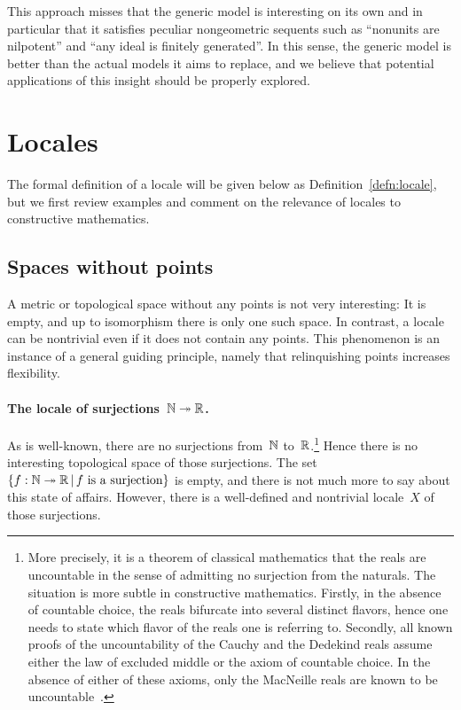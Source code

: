 \documentclass{ws-rv9x6}
\begin{document}
{{This approach misses that the generic model is interesting on its own and in
particular that it satisfies peculiar nongeometric sequents such as ``nonunits
are nilpotent'' and ``any ideal is \notnot finitely generated''. In this sense,
the generic model is better than the actual models it aims to replace, and we
believe that potential applications of this insight should be properly
explored.}


\section{Locales}
\label{sect:locales}

The formal definition of a locale will be given below as
Definition~\ref{defn:locale}, but we first review examples and comment on
the relevance of locales to constructive mathematics.

\subsection{Spaces without points}
\label{sect:examples-no-points}

A metric or topological space without any points is not very interesting: It is
empty, and up to isomorphism there is only one such space. In contrast, a
locale can be nontrivial even if it does not contain any points. This
phenomenon is an instance of a general guiding principle, namely that relinquishing
points increases flexibility.

\paragraph{The locale of surjections~$\mathbb{N} \twoheadrightarrow \mathbb{R}$.} As is
well-known, there are no surjections from~$\mathbb{N}$ to~$\mathbb{R}$.\footnote{More
precisely, it is a theorem of classical mathematics that the reals are
uncountable in the sense of admitting no surjection from the naturals. The
situation is more subtle in constructive mathematics. Firstly, in the absence
of countable choice, the reals bifurcate into several distinct flavors, hence
one needs to state which flavor of the reals one is referring to. Secondly, all
known proofs of the uncountability of the Cauchy and the Dedekind reals assume
either the law of excluded middle or the axiom of countable choice. In the
absence of either of these axioms, only the MacNeille reals are known to be
uncountable~\cite{blechschmidt-hutzler:macneille}.} Hence there is no
interesting topological space of those surjections. The set~$\{ f : \mathbb{N}
\twoheadrightarrow \mathbb{R} \,|\, \text{$f$ is a surjection} \}$ is empty, and there
is not much more to say about this state of affairs. However, there is a
well-defined and nontrivial locale~$X$ of those surjections.

}
\end{document}
